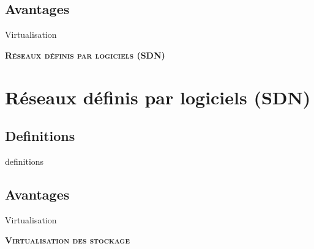 \documentclass[12pt, c]{beamer}
\begin{document}
		\subsection{Avantages}
			\begin{frame}{Virtualisation}
			\transwipe
			\vspace{-0.25cm}
				\begin{block}
	
			\end{block}
			\end{frame}
\begin{frame}
	\transdissolve
	\vspace{1cm}
		\begin{center}
			\huge \textbf{\textsc{Réseaux définis par logiciels (SDN)}}
		\end{center}
	\end{frame}

\section{Réseaux définis par logiciels (SDN)}
	\subsection{Definitions}
			\begin{frame}{definitions}
			\transwipe
			\vspace{-0.25cm}
				\begin{block}
	
			\end{block}
			\end{frame}
		\subsection{Avantages}
			\begin{frame}{Virtualisation}
			\transwipe
			\vspace{-0.25cm}
				\begin{block}
	
			\end{block}
			\end{frame}
\begin{frame}
	\transdissolve
	\vspace{1cm}
		\begin{center}
			\huge \textbf{\textsc{Virtualisation des stockage}}
		\end{center}
	\end{frame}
\end{document}
